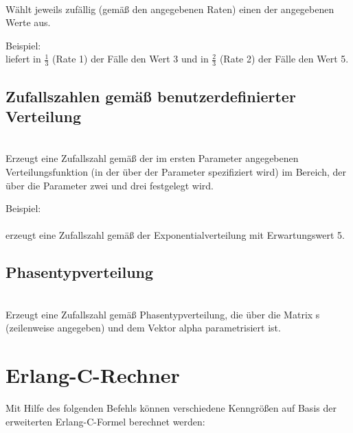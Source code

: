 \\
Wählt jeweils zufällig (gemäß den angegebenen Raten) einen der angegebenen Werte aus.

Beispiel:
\\
liefert in $\frac{1}{3}$ (Rate 1) der Fälle den Wert 3 und in $\frac{2}{3}$ (Rate 2) der Fälle den Wert 5.



\section{Zufallszahlen gemäß benutzerdefinierter Verteilung}

\\
Erzeugt eine Zufallszahl gemäß der im ersten Parameter angegebenen Verteilungsfunktion (in der über  der Parameter spezifiziert wird) im Bereich, der über die Parameter zwei und drei festgelegt wird.

Beispiel:\\
\\
erzeugt eine Zufallszahl gemäß der Exponentialverteilung mit Erwartungswert 5.



\section{Phasentypverteilung}

\\
Erzeugt eine Zufallszahl gemäß  Phasentypverteilung, die über die Matrix s (zeilenweise angegeben) und dem Vektor alpha parametrisiert ist.



\chapter{Erlang-C-Rechner}

Mit Hilfe des folgenden Befehls können verschiedene Kenngrößen auf Basis der
erweiterten Erlang-C-Formel berechnet werden:

